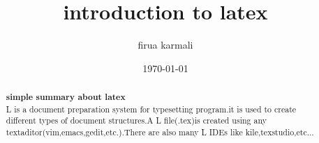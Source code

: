 \documentclass[a3 paper,12pt]{article}
\title{introduction to latex}
\author{firua karmali}
\date{\today}
\begin{document}
\begin{abstract}
\textbf{simple summary about latex}\\
L is a document preparation system for typesetting program.it is used to create different types of document structures.A L file(.tex)is created using any textaditor(vim,emacs,gedit,etc.).There are also many L IDEs like kile,texstudio,etc...
\end{abstract}
\end{document}
